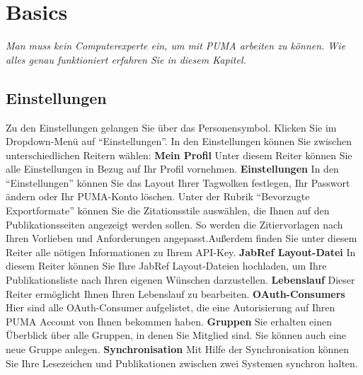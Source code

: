 \section{Basics}
\textit{Man muss kein Computerexperte ein, um mit PUMA arbeiten zu können. Wie alles genau funktioniert erfahren Sie in diesem Kapitel.}
\subsection{Einstellungen}
Zu den Einstellungen gelangen Sie über das Personensymbol. Klicken Sie im Dropdown-Menü auf \enquote{Einstellungen}. In den Einstellungen können Sie zwischen unterschiedlichen Reitern wählen:\newline \newline
\textbf{Mein Profil} \newline
Unter diesem Reiter können Sie alle Einstellungen in Bezug auf Ihr Profil vornehmen.\newline \newline 
\textbf{Einstellungen} \newline
In den \enquote{Einstellungen} können Sie das Layout Ihrer Tagwolken festlegen, Ihr Passwort ändern oder Ihr PUMA-Konto löschen. Unter der Rubrik \enquote{Bevorzugte Exportformate} können Sie die Zitationsstile auswählen, die Ihnen auf den Publikationsseiten angezeigt werden sollen. So werden die Zitiervorlagen nach Ihren Vorlieben und Anforderungen angepasst.\newline Außerdem finden Sie unter diesem Reiter alle nötigen Informationen zu Ihrem API-Key.\newline \newline
\textbf{JabRef Layout-Datei}\newline
In diesem Reiter können Sie Ihre JabRef Layout-Dateien hochladen, um Ihre Publikationsliste nach Ihren eigenen Wünschen darzustellen.  \newline \newline
\textbf{Lebenslauf} \newline
Dieser Reiter ermöglicht Ihnen Ihren Lebenslauf zu bearbeiten. \newline \newline
\textbf{OAuth-Consumers} \newline
Hier sind alle OAuth-Consumer aufgelistet, die eine Autorisierung auf Ihren PUMA Account von Ihnen bekommen haben. \newline \newline
\textbf{Gruppen}\newline
Sie erhalten einen Überblick über alle Gruppen, in denen Sie Mitglied sind. Sie können auch eine neue Gruppe anlegen. \newline \newline
\textbf{Synchronisation} \newline
Mit Hilfe der Synchronisation können Sie Ihre Lesezeichen und Publikationen zwischen zwei Systemen synchron halten.  
